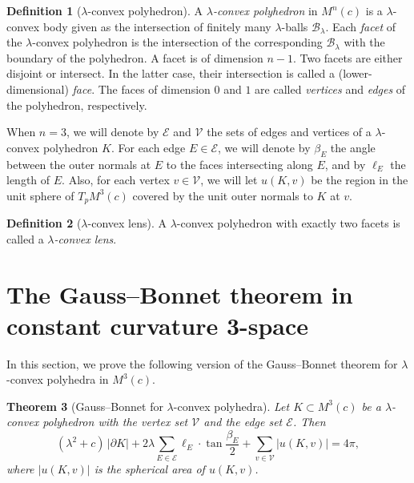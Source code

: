 \documentclass[12pt]{amsart}
\newcommand{\Bb}{\mathcal{B}}
\theoremstyle{theorem}
\newtheorem{theorem}{Theorem}[section]
\theoremstyle{Intro}
\theoremstyle{definition}
\newtheorem{definition}[theorem]{Definition}
\theoremstyle{remark}
\theoremstyle{claim}
\numberwithin{equation}{section}
\begin{document}
\begin{definition}[$\lambda$-convex polyhedron]
	\label{Def:LambdaConvexPol}
A \emph{$\lambda$-convex polyhedron} in $M^n(c)$ is a $\lambda$-convex body given as the intersection of finitely many $\lambda$-balls $\Bb_\lambda$. Each \emph{facet} of the $\lambda$-convex polyhedron is the intersection of the corresponding $\Bb_\lambda$ with the boundary of the polyhedron. A facet is of dimension $n-1$. Two facets are either disjoint or intersect. In the latter case, their intersection is called a (lower-dimensional) \emph{face}. The faces of dimension $0$ and $1$ are called {\it vertices} and {\it edges} of the polyhedron, respectively.

When $n=3$, we will denote by $\mathcal E$ and $\mathcal V$ the sets of edges and vertices of a $\lambda$-convex polyhedron $K$. For each edge $E \in \mathcal E$, we will denote by $\beta_E$ the angle between the outer normals at $E$ to the faces intersecting along $E$, and by $\ell_E$ the length of $E$. Also, for each vertex $v \in \mathcal V$, we will let $u(K,v)$ be the region in the unit sphere of $T_pM^3(c)$ covered by the unit outer normals to $K$ at $v$. 
\end{definition}

\begin{definition}[$\lambda$-convex lens]	
A $\lambda$-convex polyhedron with exactly two facets is called a \emph{$\lambda$-convex lens}. 
\end{definition}


\section{The Gauss--Bonnet theorem in constant curvature 3-space}

In this section, we prove the following version of the Gauss--Bonnet theorem for $\lambda$-convex polyhedra in $M^3(c)$.


\begin{theorem}[Gauss--Bonnet for $\lambda$-convex polyhedra]
\label{Thm:GB}
Let $K \subset M^3(c)$ be a $\lambda$-convex polyhedron with the vertex set $\mathcal V$ and the edge set $\mathcal E$.  Then
\begin{equation}
    \label{Eq:GB}
    \left(\lambda^2 + c\right) \, |\partial K| + 2\lambda \sum_{E \in \mathcal E} \ell_E \cdot \tan \frac{\beta_E}{2} + \sum_{v \in \mathcal V}|u(K,v)| = 4\pi,
\end{equation}where  $|u(K,v)|$ is the spherical area of $u(K,v)$.
\end{theorem}
\end{document}
